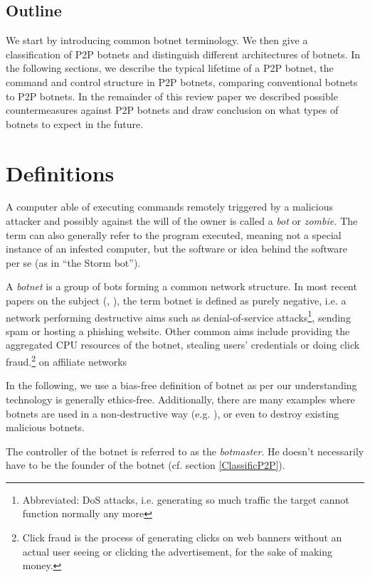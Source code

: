 \documentclass{llncs}
\begin{document}
\subsection*{Outline}
We start by introducing common botnet terminology. We then give a
classification of P2P botnets and distinguish different architectures
of botnets. In the following sections, we describe the typical
lifetime of a P2P botnet, the command and control structure in P2P
botnets, comparing conventional botnets to P2P botnets. In the
remainder of this review paper we described possible countermeasures
against P2P botnets and draw conclusion on what types of botnets to
expect in the future.


\section{Definitions}
A computer able of executing commands remotely triggered by a
malicious attacker and possibly against the will of the owner is
called a {\it bot} or {\it zombie.} The term can also generally refer
to the program executed, meaning not a special instance of an infested
computer, but the software or idea behind the software per se (as in
``the Storm bot'').

A {\it botnet} is a group of bots forming a common network
structure.\cite{schoof2007detecting} In most recent papers on the
subject (\cite{wang2009systematic}, \cite{abu2006multifaceted}), the
term botnet is defined as purely negative, i.e. a network performing
destructive aims such as denial-of-service
attacks\footnote{Abbreviated: DoS attacks, i.e. generating so much
  traffic the target cannot function normally any more}, sending spam
or hosting a phishing website\cite{steggink2007detection}. Other
common aims include providing the aggregated CPU resources of the
botnet, stealing users' credentials \cite{borgaonkar2010analysis} or
doing click fraud.\footnote{Click fraud is the process of generating
  clicks on web banners without an actual user seeing or clicking the
  advertisement, for the sake of making money.} on affiliate
networks\cite{clickFraud}

In the following, we use a bias-free definition of botnet as per
our understanding technology is generally ethics-free. Additionally,
there are many examples where botnets are used in a non-destructive
way (e.g. \cite{seti}), or even to destroy existing malicious botnets.

The controller of the botnet is referred to as the {\it
  botmaster}. He doesn't necessarily have to be the founder of the
botnet (cf. section \ref{ClassificP2P}).
\end{document}
